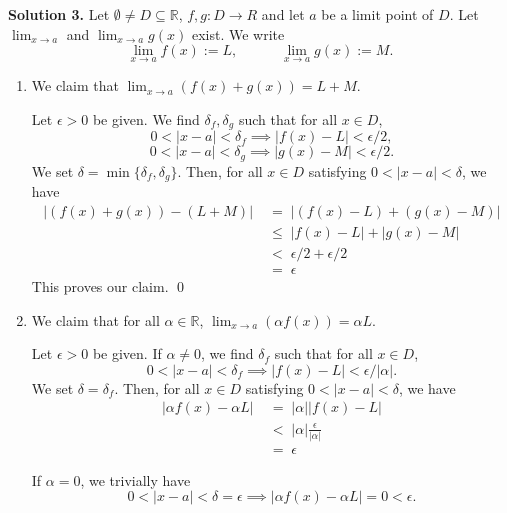\documentclass[10pt]{article}
\begin{document}
        \textbf{Solution 3.}
        Let $\emptyset \neq D \subseteq \mathbb{R}$, $f, g\colon D \to R$ and let $a$ be a limit point of $D$.
        Let $\lim_{x\to a}$ and $\lim_{x\to a} g(x)$ exist. We write
        \[
        \lim_{x\to a} f(x) := L,        \quad\quad\quad \lim_{x\to a} g(x) := M.
        \]
        \begin{enumerate}
                \item We claim that $\lim_{x\to a}(f(x) + g(x)) = L + M$.

                Let $\epsilon > 0$ be given.
                We find $\delta_f, \delta_g$ such that for all $x \in D$,
                \[0 < |x - a| < \delta_f \implies |f(x) - L| < \epsilon/2,\]
                \[0 < |x - a| < \delta_g \implies |g(x) - M| < \epsilon/2.\]
                We set $\delta = \min\{\delta_f, \delta_g\}$. Then, for all $x \in D$ satisfying
                $0 < |x - a| < \delta$, we have
                \begin{align*}
                |(f(x) + g(x)) - (L + M)| \;&=\; |(f(x) - L) + (g(x) - M)| \\
                        \;&\le\; |f(x) - L| + |g(x) - M| \\
                        \;&<\; \epsilon/2 + \epsilon/2 \\
                        \;&=\; \epsilon
                \end{align*}
                This proves our claim. \qed

                \item We claim that for all $\alpha \in \mathbb{R}$, $\lim_{x\to a}(\alpha f(x)) = \alpha L$.

                Let $\epsilon > 0$ be given.
                If $\alpha \neq 0$, we find $\delta_f$ such that for all $x \in D$,
                \[0 < |x - a| < \delta_f \implies |f(x) - L| < \epsilon/|\alpha|.\]
                We set $\delta = \delta_f$. Then, for all $x \in D$ satisfying
                $0 < |x - a| < \delta$, we have
                \begin{align*}
                |\alpha f(x) - \alpha L| \;&=\; |\alpha| |f(x) - L| \\
                        \;&<\; |\alpha| \frac{\epsilon}{|\alpha|} \\
                        \;&=\; \epsilon
                \end{align*}

                If $\alpha = 0$, we trivially have
                \[0 < |x - a| < \delta = \epsilon \implies |\alpha f(x) - \alpha L| = 0 < \epsilon.\]


\end{enumerate}
\end{document}
